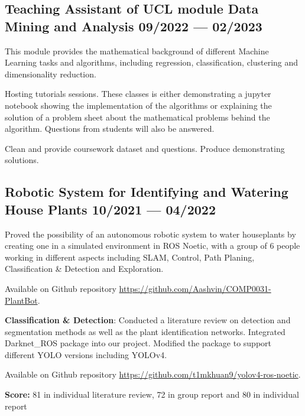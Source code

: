 \subsection{
    Teaching Assistant of UCL module Data Mining and Analysis
    \hfill 09/2022 --- 02/2023
}
    \begin{zitemize}
        \item   This module provides the mathematical background of different Machine 
                Learning tasks and algorithms, including regression, classification, 
                clustering and dimensionality reduction.
        \item   Hosting tutorials sessions. These classes is either demonstrating a jupyter
                notebook showing the implementation of the algorithms or explaining the solution of 
                a problem sheet about the mathematical problems behind the algorithm. Questions 
                from students will also be answered. 
        \item   Clean and provide coursework dataset and questions. 
                Produce demonstrating solutions.
    \end{zitemize}

\subsection{
    Robotic System for Identifying and Watering House Plants 
    \hfill 10/2021 --- 04/2022
}
    \begin{zitemize}
        \item   Proved the possibility of an autonomous robotic system to water houseplants
                by creating one in a simulated environment in ROS Noetic, 
                with a group of 6 people working in different aspects including
                SLAM, Control, Path Planing, Classification \& Detection and Exploration.
        \item   Available on Github repository
                \url{https://github.com/Aashvin/COMP0031-PlantBot}.
        \item   \textbf{Classification \& Detection}: 
                Conducted a literature review on detection and 
                segmentation methods as well as the plant identification networks.
                Integrated Darknet\_ROS package into our project.
                Modified the package to support different YOLO versions including YOLOv4.
        \item   Available on Github repository
                \url{https://github.com/t1mkhuan9/yolov4-ros-noetic}.
        \item   \textbf{Score:}
                81 in individual literature review, 72 in group report and 80 in individual report
    \end{zitemize}


